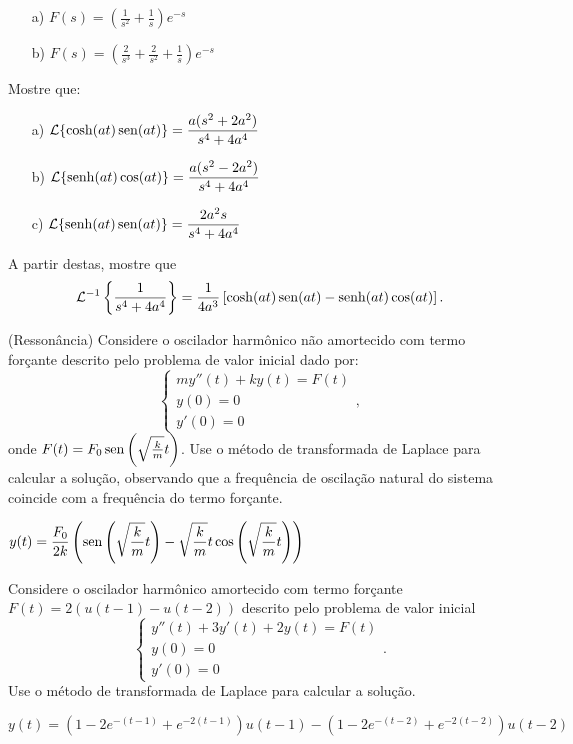 \begin{Answer}
 \begin{itemize}
  \item[a)] $F(s)=\left(\frac{1}{s^2}+\frac{1}{s}\right)e^{-s}$
      \item[b)] $F(s)=\left(\frac{2}{s^3}+\frac{2}{s^2}+\frac{1}{s}\right)e^{-s}$
 \end{itemize}
\end{Answer}

\begin{Exercise}
Mostre que:
\begin{itemize}
  \item[a)] $\displaystyle \mathcal{L}\{ \cosh (at) \operatorname{sen} (at) \} = \frac{a (s^2 + 2 a^2)}{s^4 + 4a^4}$
  \item[b)] $\displaystyle \mathcal{L} \{ \operatorname{senh} (at) \cos (at) \} = \frac{a (s^2 - 2 a^2)}{s^4 + 4a^4}$
  \item[c)] $\displaystyle \mathcal{L} \{ \operatorname{senh} (at) \operatorname{sen} (at) \} = \frac{2 a^2 s}{s^4 + 4a^4}$
\end{itemize}
 \noindent A partir destas, mostre que $$\mathcal{L}^{-1}\left\{ \frac{1}{s^4 + 4a^4}\right\} = \frac{1}{4a^3} \left[\cosh (at) \operatorname{sen} (at) - \operatorname{senh} (at) \cos(at)\right]. $$
\end{Exercise}


\begin{Exercise}(Ressonância) Considere o oscilador harmônico não amortecido com termo forçante descrito pelo problema de valor inicial dado por:
$$\left\{
\begin{array}{l}
 my''(t)+ky(t)=F(t)\\
 y(0)=0\\
 y'(0)=0
\end{array}
\right.,
$$
onde $F(t)=F_0\operatorname{sen}\left(\sqrt{\frac{k}{m}}t\right)$.
Use o método de transformada de Laplace para calcular a solução, observando que a frequência de oscilação natural do sistema coincide com a frequência do termo forçante.
\end{Exercise}
\begin{Answer}
$\displaystyle y(t)=\frac{F_0}{2k}\left(\operatorname{sen}\left(\sqrt{\frac{k}{m}}t\right)-\sqrt{\frac{k}{m}}t\cos\left(\sqrt{\frac{k}{m}}t\right)\right)$
\end{Answer}
\begin{Exercise}Considere o oscilador harmônico amortecido com termo forçante $F(t)=2(u(t-1)-u(t-2))$ descrito pelo problema de valor inicial
$$\left\{
\begin{array}{l}
 y''(t)+3y'(t)+2y(t)=F(t)\\
 y(0)=0\\
 y'(0)=0
\end{array}
\right..
$$
Use o método de transformada de Laplace para calcular a solução.
\end{Exercise}
\begin{Answer}
$\displaystyle y(t)=(1-2e^{-(t-1)}+e^{-2(t-1)})u(t-1)-(1-2e^{-(t-2)}+e^{-2(t-2)})u(t-2)$
\end{Answer}

